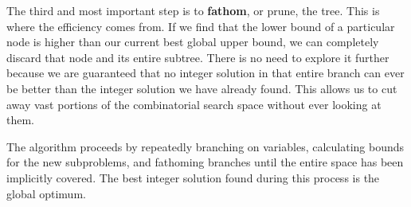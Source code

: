 The third and most important step is to \textbf{fathom}, or prune, the tree. This is where the efficiency comes from. If we find that the lower bound of a particular node is higher than our current best global upper bound, we can completely discard that node and its entire subtree. There is no need to explore it further because we are guaranteed that no integer solution in that entire branch can ever be better than the integer solution we have already found. This allows us to cut away vast portions of the combinatorial search space without ever looking at them.

The algorithm proceeds by repeatedly branching on variables, calculating bounds for the new subproblems, and fathoming branches until the entire space has been implicitly covered. The best integer solution found during this process is the global optimum.


